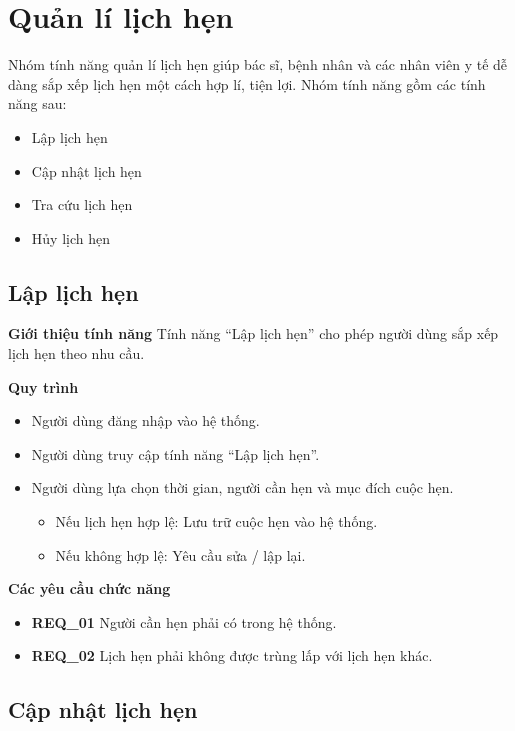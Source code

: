 \section{Quản lí lịch hẹn}

Nhóm tính năng quản lí lịch hẹn giúp bác sĩ, bệnh nhân và các nhân viên y tế dễ dàng sắp xếp lịch hẹn một cách hợp lí, tiện lợi. Nhóm tính năng gồm các tính năng sau:
\begin{itemize}
    \item Lập lịch hẹn
    \item Cập nhật lịch hẹn
    \item Tra cứu lịch hẹn
    \item Hủy lịch hẹn
\end{itemize}

\subsection{Lập lịch hẹn}

\noindent \textbf{Giới thiệu tính năng}
Tính năng ``Lập lịch hẹn'' cho phép người dùng sắp xếp lịch hẹn theo nhu cầu.

\noindent \textbf{Quy trình}
\begin{itemize}
    \item Người dùng đăng nhập vào hệ thống.
    \item Người dùng truy cập tính năng ``Lập lịch hẹn''.
    \item Người dùng lựa chọn thời gian, người cần hẹn và mục đích cuộc hẹn.
    \begin{itemize}
        \item Nếu lịch hẹn hợp lệ: Lưu trữ cuộc hẹn vào hệ thống.
        \item Nếu không hợp lệ: Yêu cầu sửa / lập lại.
    \end{itemize}
\end{itemize}

\noindent \textbf{Các yêu cầu chức năng}
\begin{itemize}
    \item \textbf{REQ\_01} Người cần hẹn phải có trong hệ thống.
    \item \textbf{REQ\_02} Lịch hẹn phải không được trùng lấp với lịch hẹn khác.
\end{itemize}

\subsection{Cập nhật lịch hẹn}


